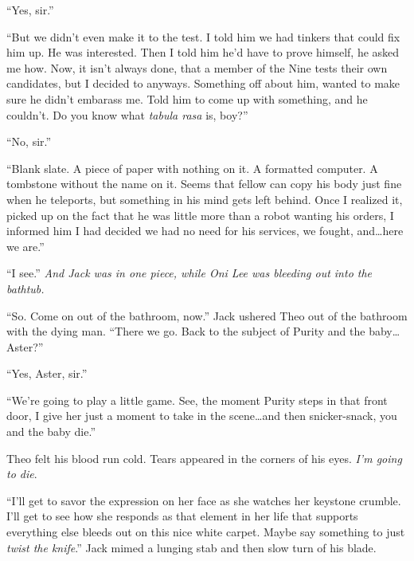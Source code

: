 ``Yes, sir.''



``But we didn't even make it to the test.  I told him we had tinkers that could fix him up.  He was interested.  Then I told him he'd have to prove himself, he asked me how.  Now, it isn't always done, that a member of the Nine tests their own candidates, but I decided to anyways.  Something off about him, wanted to make sure he didn't embarass me.  Told him to come up with something, and he couldn't.  Do you know what \emph{tabula rasa} is, boy?''



``No, sir.''



``Blank slate.  A piece of paper with nothing on it.  A formatted computer.  A tombstone without the name on it.  Seems that fellow can copy his body just fine when he teleports, but something in his mind gets left behind.  Once I realized it, picked up on the fact that he was little more than a robot wanting his orders, I informed him I had decided we had no need for his services, we fought, and\ldots here we are.''



``I see.''  \emph{And Jack was in one piece, while Oni Lee was bleeding out into the bathtub.}



``So.  Come on out of the bathroom, now.'' Jack ushered Theo out of the bathroom with the dying man. ``There we go.  Back to  the subject of Purity and the baby\ldots  Aster?''



``Yes, Aster, sir.''



``We're going to play a little game.  See, the moment Purity steps in that front door, I give her just a moment to take in the scene\ldots and then snicker-snack, you and the baby die.''



Theo felt his blood run cold.  Tears appeared in the corners of his eyes.  \emph{I'm going to die}.



``I'll get to savor the expression on her face as she watches her keystone crumble.  I'll get to see how she responds as that element in her life that supports everything else bleeds out on this nice white carpet.  Maybe say something to just \emph{twist the knife}.'' Jack mimed a lunging stab and then slow turn of his blade.



